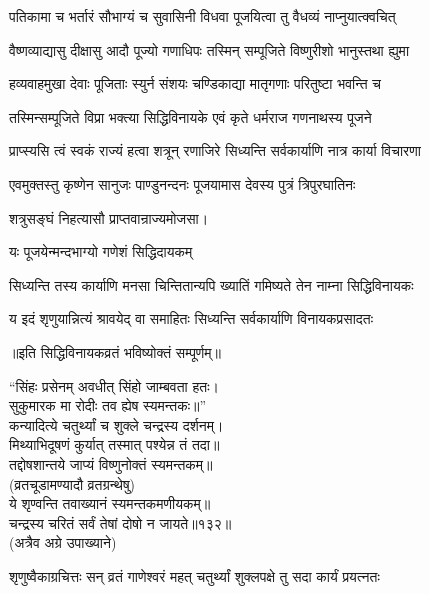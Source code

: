 \begin{center}
\twolineshloka
{पतिकामा च भर्तारं सौभाग्यं च सुवासिनी}
{विधवा पूजयित्वा तु वैधव्यं नाप्नुयात्क्वचित्}%

\twolineshloka
{वैष्णव्याद्यासु दीक्षासु आदौ पूज्यो गणाधिपः}
{तस्मिन् सम्पूजिते विष्णुरीशो भानुस्तथा ह्युमा}%

\twolineshloka
{हव्यवाहमुखा देवाः पूजिताः स्युर्न संशयः}
{चण्डिकाद्या मातृगणाः परितुष्टा भवन्ति च}%

\twolineshloka
{तस्मिन्सम्पूजिते विप्रा भक्त्या सिद्धिविनायके}
{एवं कृते धर्मराज गणनाथस्य पूजने}%

\twolineshloka
{प्राप्स्यसि त्वं स्वकं राज्यं हत्वा शत्रून् रणाजिरे}
{सिध्यन्ति सर्वकार्याणि नात्र कार्या विचारणा}%

\twolineshloka
{एवमुक्तस्तु कृष्णेन सानुजः पाण्डुनन्दनः}
{पूजयामास देवस्य पुत्रं त्रिपुरघातिनः}%

शत्रुसङ्घं निहत्यासौ प्राप्तवान्राज्यमोजसा।

\onelineshloka
{यः पूजयेन्मन्दभाग्यो गणेशं सिद्धिदायकम्}%

\twolineshloka
{सिध्यन्ति तस्य कार्याणि मनसा चिन्तितान्यपि}
{ख्यातिं गमिष्यते तेन नाम्ना सिद्धिविनायकः}%

\twolineshloka
{य इदं शृणुयान्नित्यं श्रावयेद् वा समाहितः}
{सिध्यन्ति सर्वकार्याणि विनायकप्रसादतः}%

॥इति सिद्धिविनायकव्रतं भविष्योक्तं सम्पूर्णम्॥

“सिंहः प्रसेनम् अवधीत् सिंहो जाम्बवता हतः।\\
सुकुमारक मा रोदीः तव ह्येष स्यमन्तकः॥”\\

कन्यादित्ये चतुर्थ्यां च शुक्ले चन्द्रस्य दर्शनम्।\\
मिथ्याभिदूषणं कुर्यात् तस्मात् पश्येन्न तं तदा॥\\
तद्दोषशान्तये जाप्यं विष्णुनोक्तं स्यमन्तकम्॥\\
(व्रतचूडामण्यादौ व्रतग्रन्थेषु)\\

ये शृण्वन्ति तवाख्यानं स्यमन्तकमणीयकम्॥ \\
चन्द्रस्य चरितं सर्वं तेषां दोषो न जायते॥१३२॥\\
(अत्रैव अग्रे उपाख्याने)\\



\twolineshloka
{शृणुष्वैकाग्रचित्तः सन् व्रतं गाणेश्वरं महत्}
{चतुर्थ्यां शुक्लपक्षे तु सदा कार्यं प्रयत्नतः}%


\end{center}
